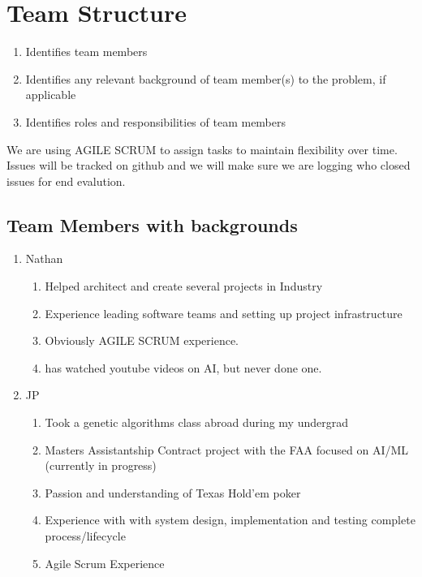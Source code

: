 \documentclass[11pt]{article}
\begin{document}
\section{Team Structure}
\begin{enumerate}
\item Identifies team members
\item Identifies any relevant background of team member(s) to the problem, if applicable
\item Identifies roles and responsibilities of team members
\end{enumerate}

We are using AGILE SCRUM to assign tasks to maintain flexibility over time. Issues will be tracked on github and
we will make sure we are logging who closed issues for end evalution.
\subsection{Team Members with backgrounds}
\begin{enumerate}
\item Nathan 
  \begin{enumerate}
  \item Helped architect and create several projects in Industry
  \item Experience leading software teams and setting up project infrastructure
  \item Obviously AGILE SCRUM experience.
  \item has watched youtube videos on AI, but never done one.
  \end{enumerate}
\item JP
  \begin{enumerate}
  \item Took a genetic algorithms class abroad during my undergrad
  \item Masters Assistantship Contract project with the FAA focused on AI/ML (currently in progress)
  \item Passion and understanding of Texas Hold'em poker
  \item Experience with with system design, implementation and testing complete process/lifecycle
  \item Agile Scrum Experience

  \end{enumerate}
\end{enumerate}
\end{document}

